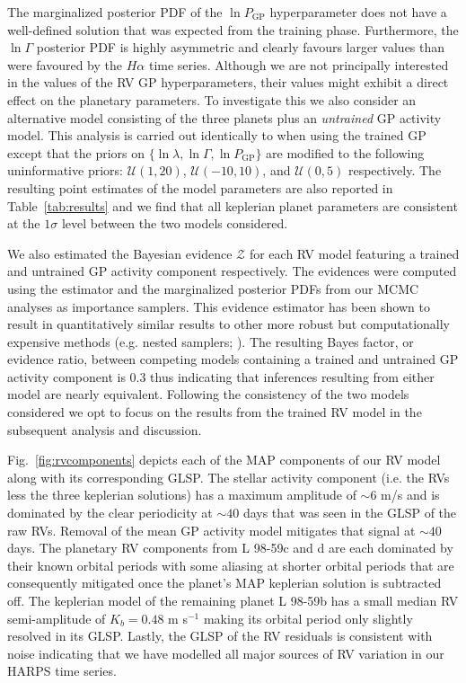 \documentclass[longauth]{aa}
\newcommand{\mps}{m s$^{-1}$}
\begin{document}
The marginalized posterior PDF of the $\ln{P_{\text{GP}}}$ hyperparameter does not have a well-defined solution that was expected from the training phase. Furthermore, the $\ln{\Gamma}$ posterior PDF is highly asymmetric and clearly favours larger values than were favoured by the $H\alpha$ time series. Although we are not principally interested in the values of the RV GP hyperparameters, their values might exhibit a direct effect on the planetary parameters. To investigate this we also consider an alternative model consisting of the three planets plus an \emph{untrained} GP activity model. This analysis is carried out identically to when using the trained GP except that the priors on $\{ \ln{\lambda}, \ln{\Gamma}, \ln{P_{\text{GP}}} \}$ are modified to the following uninformative priors: $\mathcal{U}(1,20)$, $\mathcal{U}(-10,10)$, and $\mathcal{U}(0,5)$ respectively. The resulting point estimates of the model parameters are also reported in Table~\ref{tab:results} and we find that all keplerian planet parameters are consistent at the $1\sigma$ level between the two models considered. 

We also estimated the Bayesian evidence $\mathcal{Z}$ for each RV model featuring a trained and untrained GP activity component respectively. The evidences were computed using the \cite{perrakis14} estimator and the marginalized posterior PDFs from our MCMC analyses as importance samplers. This evidence estimator has been shown to result in quantitatively similar results to other more robust but computationally expensive methods (e.g. nested samplers; \citealt{nelson18}). The resulting Bayes factor, or evidence ratio, between competing models containing a trained and untrained GP activity component is 0.3 thus indicating that inferences resulting from either model are nearly equivalent. Following the consistency of the two models considered we opt to focus on the results from the trained RV model in the subsequent analysis and discussion.

Fig.~\ref{fig:rvcomponents} depicts each of the MAP components of our RV model along with its corresponding GLSP. The stellar activity component (i.e. the RVs less the three keplerian solutions) has a maximum amplitude of $\sim 6$ m/s and is dominated by the clear periodicity at $\sim 40$ days that was seen in the GLSP of the raw RVs. Removal of the mean GP activity model mitigates that signal at $\sim 40$ days. The planetary RV components from L 98-59c and d are each dominated by their known orbital periods with some aliasing at shorter orbital periods that are consequently mitigated once the planet's MAP keplerian solution is subtracted off. The keplerian model of the remaining planet L 98-59b has a small median RV semi-amplitude of $K_b = 0.48$ \mps{} making its orbital period only slightly resolved in its GLSP. Lastly, the GLSP of the RV residuals is consistent with noise indicating that we have modelled all major sources of RV variation in our HARPS time series.
\end{document}
